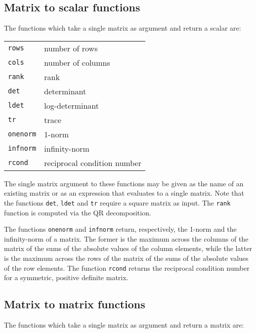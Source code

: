 \subsection{Matrix to scalar functions}
\label{matrix-to-scalar}

The functions which take a single matrix as argument and return a
scalar are:

\begin{center}
\begin{tabular}{ll}
\texttt{rows} & number of rows \\
\texttt{cols} & number of columns \\
\texttt{rank} & rank \\
\texttt{det} & determinant \\
\texttt{ldet} & log-determinant \\
\texttt{tr} & trace \\
\texttt{onenorm} & 1-norm \\
\texttt{infnorm} & infinity-norm \\
\texttt{rcond} & reciprocal condition number
\end{tabular}
\end{center}

The single matrix argument to these functions may be given as the name
of an existing matrix or as an expression that evaluates to a single
matrix.  Note that the functions \texttt{det}, \texttt{ldet} and
\texttt{tr} require a square matrix as input.  The \texttt{rank}
function is computed via the QR decomposition.

The functions \texttt{onenorm} and \texttt{infnorm} return,
respectively, the 1-norm and the infinity-norm of a matrix.  The
former is the maximum across the columns of the matrix of the sums of
the absolute values of the column elements, while the latter is the
maximum across the rows of the matrix of the sums of the absolute
values of the row elements.  The function \texttt{rcond} returns the
reciprocal condition number for a symmetric, positive definite matrix.

\subsection{Matrix to matrix functions}
\label{matrix-to-matrix}

The functions which take a single matrix as argument and return a
matrix are:


